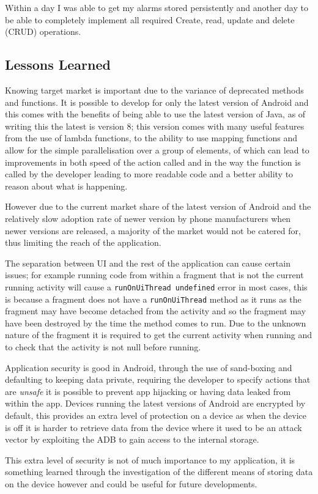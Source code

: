 Within a day I was able to get my alarms stored persistently and another
day to be able to completely implement all required Create, read, update
and delete (CRUD) operations.

\subsection{Lessons Learned}\label{lessons-learned}

Knowing target market is important due to the variance of deprecated
methods and functions. It is possible to develop for only the latest
version of Android and this comes with the benefits of being able to use
the latest version of Java, as of writing this the latest is version 8;
this version comes with many useful features from the use of lambda
functions, to the ability to use mapping functions and allow for the
simple parallelisation over a group of elements, of which can lead to
improvements in both speed of the action called and in the way the
function is called by the developer leading to more readable code and a
better ability to reason about what is happening.

However due to the current market share of the latest version of Android
and the relatively slow adoption rate of newer version by phone
manufacturers when newer versions are released, a majority of the market
would not be catered for, thus limiting the reach of the application.

The separation between UI and the rest of the application can cause
certain issues; for example running code from within a fragment that is
not the current running activity will cause a
\lstinline!runOnUiThread undefined! error in most cases, this is because
a fragment does not have a \lstinline!runOnUiThread! method as it runs
as the fragment may have become detached from the activity and so the
fragment may have been destroyed by the time the method comes to run.
Due to the unknown nature of the fragment it is required to get the
current activity when running and to check that the activity is not null
before running.

Application security is good in Android, through the use of sand-boxing
and defaulting to keeping data private, requiring the developer to
specify actions that are \emph{unsafe} it is possible to prevent app
hijacking or having data leaked from within the app. Devices running the
latest versions of Android are encrypted by default, this provides an
extra level of protection on a device as when the device is off it is
harder to retrieve data from the device where it used to be an attack
vector by exploiting the ADB to gain access to the internal storage.

This extra level of security is not of much importance to my
application, it is something learned through the investigation of the
different means of storing data on the device however and could be
useful for future developments.
